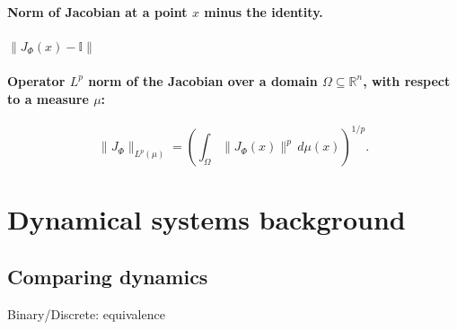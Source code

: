 \documentclass{article}
\theoremstyle{definition} \newtheorem{definition}{Definition}  \newtheorem{example}{Example}
\theoremstyle{remark} \newtheorem{remark}{Remark}
\newcounter{ct}
\begin{document}
\paragraph{Norm of Jacobian at a point \( x \) minus the identity.}
\(\|J_{\Phi}(x) - \mathbb{I}\| \)

\paragraph{Operator \( L^p \) norm of the Jacobian over a domain \( \Omega \subseteq \mathbb{R}^n \), with respect to a measure \( \mu \):}
\[
\|J_{\Phi}\|_{L^p(\mu)} = \left( \int_{\Omega} \|J_{\Phi}(x)\|^p \, d\mu(x) \right)^{1/p}.
\]


%
%
%
%
%
%






\newpage
\section{Dynamical systems background}

\subsection{Comparing dynamics}
Binary/Discrete: equivalence
\end{document}
